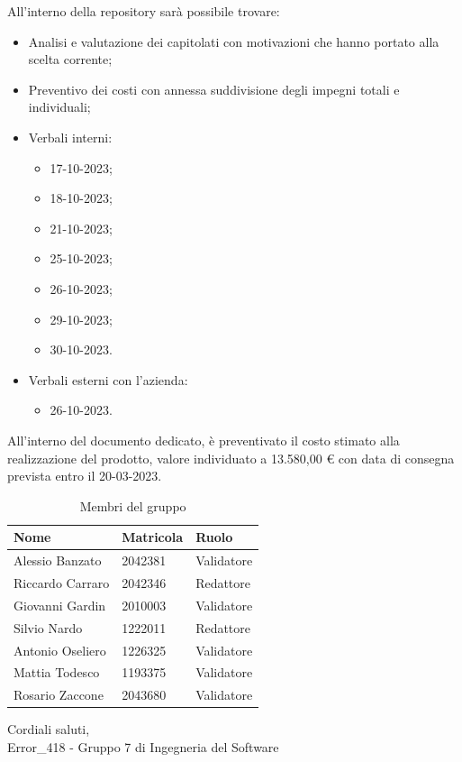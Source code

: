 \documentclass[a4paper, twoside]{article}
\begin{document}
All'interno della repository sarà possibile trovare:
\begin{itemize}
    \item Analisi e valutazione dei capitolati con motivazioni che hanno portato alla scelta corrente;
    \item Preventivo dei costi con annessa suddivisione degli impegni totali e individuali;
    \item Verbali interni:
    \begin{itemize}
        \item 17-10-2023;
        \item 18-10-2023;
        \item 21-10-2023;
        \item 25-10-2023;
        \item 26-10-2023;
        \item 29-10-2023;
        \item 30-10-2023.
    \end{itemize}
    \item Verbali esterni con l'azienda:
    \begin{itemize}
        \item 26-10-2023.
    \end{itemize}
\end{itemize}
All'interno del documento dedicato, è preventivato il costo stimato alla realizzazione del prodotto, valore individuato a 13.580,00 € con data di consegna prevista entro il 20-03-2023.\\

\begin{table}[h]
\centering
\caption*{Membri del gruppo}
\begin{tabular}{lll}
\toprule
Nome & Matricola & Ruolo \\
\midrule
Alessio Banzato & 2042381 & Validatore \\
Riccardo Carraro & 2042346 & Redattore \\
Giovanni Gardin & 2010003 & Validatore \\
Silvio Nardo & 1222011 & Redattore \\
Antonio Oseliero & 1226325 & Validatore \\
Mattia Todesco & 1193375 & Validatore \\
Rosario Zaccone & 2043680 & Validatore \\
\bottomrule
\end{tabular}
\end{table}

Cordiali saluti,\\
Error\_418 - Gruppo 7 di Ingegneria del Software
\end{document}
